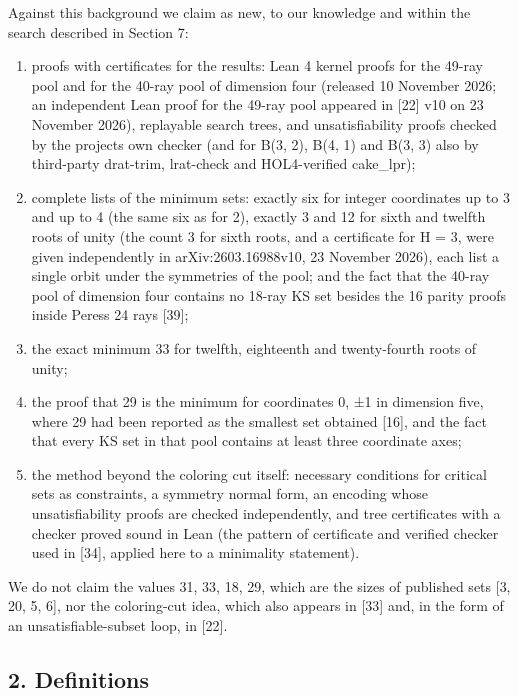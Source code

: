\documentclass[11pt,a4paper]{article}
\providecommand{\tightlist}{\setlength{\itemsep}{0pt}\setlength{\parskip}{0pt}}
\begin{document}
Against this background we claim as new, to our knowledge and within the search described in
Section 7:

\begin{enumerate}
\def\labelenumi{\arabic{enumi}.}
\tightlist
\item
  proofs with certificates for the results: Lean 4 kernel proofs for the 49-ray pool and for the
  40-ray pool of dimension four (released 10 November 2026; an independent Lean proof for the 49-ray
  pool appeared in {[}22{]} v10 on 23 November 2026), replayable search trees, and unsatisfiability proofs
  checked by the project\textquotesingle s own checker (and for B(3, 2), B(4, 1) and B(3, 3) also by third-party
  drat-trim, lrat-check and HOL4-verified cake\_lpr);
\item
  complete lists of the minimum sets: exactly six for integer coordinates up to 3 and up to 4 (the
  same six as for 2), exactly 3 and 12 for sixth and twelfth roots of unity (the count 3 for sixth
  roots, and a certificate for H = 3, were given independently in arXiv:2603.16988v10, 23 November
  2026), each list a single orbit
  under the symmetries of the pool; and the fact that the 40-ray pool of dimension four contains no
  18-ray KS set besides the 16 parity proofs inside Peres\textquotesingle s 24 rays {[}39{]};
\item
  the exact minimum 33 for twelfth, eighteenth and twenty-fourth roots of unity;
\item
  the proof that 29 is the minimum for coordinates 0, ±1 in dimension five, where 29 had been
  reported as the smallest set obtained {[}16{]}, and the fact that every KS set in that pool contains
  at least three coordinate axes;
\item
  the method beyond the coloring cut itself: necessary conditions for critical sets as constraints,
  a symmetry normal form, an encoding whose unsatisfiability proofs are checked independently, and
  tree certificates with a checker proved sound in Lean (the pattern of certificate and verified
  checker used in {[}34{]}, applied here to a minimality statement).
\end{enumerate}

We do not claim the values 31, 33, 18, 29, which are the sizes of published sets {[}3, 20, 5, 6{]}, nor
the coloring-cut idea, which also appears in {[}33{]} and, in the form of an unsatisfiable-subset loop, in
{[}22{]}.

\subsection{2. Definitions}\label{2-definitions}
\end{document}
